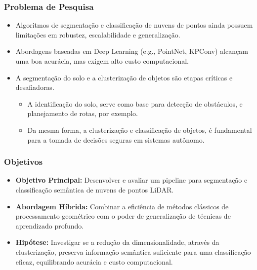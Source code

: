 \documentclass[aspectratio=169,t,xcolor=table]{beamer}
\begin{document}
\begin{frame}
    \frametitle{Problema de Pesquisa}
    \begin{itemize}
        \item<+-> Algoritmos de segmentação e classificação de nuvens de pontos
              ainda possuem limitações em robustez, escalabilidade e
              generalização.
        \item<+-> Abordagens baseadas em Deep Learning (e.g., PointNet, KPConv)
              alcançam uma boa acurácia, mas exigem alto custo computacional.
        \item<+-> A segmentação do solo e a clusterização de objetos são etapas
              críticas e desafiadoras.
              \begin{itemize}
                  \item<+-> A identificação do solo, serve como base para
                        detecção de obstáculos, e planejamento de rotas, por
                        exemplo.
                  \item<+-> Da mesma forma, a clusterização e classificação de
                        objetos, é fundamental para a tomada de decisões
                        seguras em sistemas autônomo.
              \end{itemize}
    \end{itemize}
\end{frame}

\begin{frame}
    \frametitle{Objetivos}
    \begin{itemize}
        \item<+-> \textbf{Objetivo Principal:} Desenvolver e avaliar um
              pipeline para segmentação e classificação semântica de
              nuvens de pontos LiDAR.
        \item<+-> \textbf{Abordagem Híbrida:} Combinar a eficiência de métodos
              clássicos de processamento geométrico com o poder de
              generalização de técnicas de aprendizado profundo.
        \item<+-> \textbf{Hipótese:} Investigar se a redução da
              dimensionalidade, através da clusterização, preserva informação
              semântica suficiente para uma classificação eficaz, equilibrando
              acurácia e custo computacional.
    \end{itemize}
\end{frame}

\end{document}
